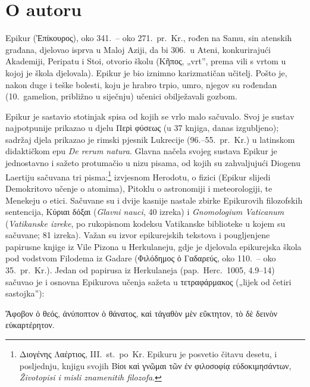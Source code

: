 \section*{O autoru}

Epikur (Ἐπίκουρος), oko 341.\ – oko 271.\ pr.~Kr., rođen na Samu, sin atenskih građana, djelovao isprva u Maloj Aziji, da bi 306.\ u Ateni, konkurirajući Akademiji, Peripatu i Stoi, otvorio školu (Κῆπος, „vrt”, prema vili s vrtom u kojoj je škola djelovala). Epikur je bio iznimno karizmatičan učitelj. Pošto je, nakon duge i teške bolesti, koju je hrabro trpio, umro, njegov su rođendan (10.\ gamelion, približno u siječnju) učenici obilježavali gozbom.

Epikur je sastavio stotinjak spisa od kojih se vrlo malo sačuvalo. Svoj je sustav najpotpunije prikazao u djelu Περὶ φύσεως (u 37 knjiga, danas izgubljeno); sadržaj djela prikazao je rimski pjesnik Lukrecije (96.–55.\ pr.~Kr.) u latinskom didaktičkom epu \textit{De rerum natura}. Glavna načela svojeg sustava Epikur je jednostavno i sažeto protumačio u nizu pisama, od kojih su zahvaljujući Diogenu Laertiju sačuvana tri pisma:\footnote{Διογένης Λαέρτιος, III.\ st.\ po~Kr. Epikuru je posvetio čitavu desetu, i posljednju, knjigu svojih \textgreek{Βίοι καὶ γνῶμαι τῶν ἐν φιλοσοφίᾳ εὐδοκιμησάντων,} \textit{Životopisi i misli znamenitih filozofa}.} izvjesnom Herodotu, o fizici (Epikur slijedi Demokritovo učenje o atomima), Pitoklu o astronomiji i meteorologiji, te Menekeju o etici. Sačuvane su i dvije kasnije nastale zbirke Epikurovih filozofskih sentencija, Κύριαι δόξαι (\textit{Glavni nauci}, 40 izreka) i \textit{Gnomologium Vaticanum} (\textit{Vatikanske izreke}, po rukopisnom kodeksu Vatikanske biblioteke u kojem su sačuvane; 81 izreka). Važan su izvor epikurejskih tekstova i pougljenjene papirusne knjige iz Vile Pizona u Herkulaneju, gdje je djelovala epikurejska škola pod vodstvom Filodema iz Gadare (Φιλόδημος ὁ Γαδαρεύς, oko 110.\ – oko 35.\ pr.~Kr.). Jedan od papirusa iz Herkulaneja (pap.\ Herc.\ 1005, 4.9–14) sačuvao je i osnovna Epikurova učenja sažeta u τετραφάρμακος („lijek od četiri sastojka”): \begin{greek}Ἄφοβον ὁ θεός, ἀνύποπτον ὁ θάνατος, καὶ τἀγαθὸν μὲν εὔκτητον, τὸ δὲ δεινὸν εὐκαρτέρητον.\end{greek}

